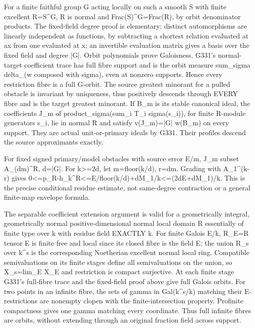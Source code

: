 For a finite faithful group G acting locally on such a smooth S with finite excellent R=S\textasciicircum{}G, R is normal and Frac(S)\textasciicircum{}G=Frac(R), by orbit denominator products. The fixed-field degree proof is elementary: distinct automorphisms are linearly independent as functions, by subtracting a shortest relation evaluated at ax from one evaluated at x; an invertible evaluation matrix gives a basis over the fixed field and degree |G|. Orbit polynomials prove Galoisness. G331's normal-target coefficient trace has full fibre support and is the orbit measure sum\_sigma delta\_(w composed with sigma), even at nonzero supports. Hence every restriction fibre is a full G-orbit. The source greatest minorant for a pulled obstacle is invariant by uniqueness, thus positively descends through EVERY fibre and is the target greatest minorant. If B\_m is its stable canonical ideal, the coefficients J\_m of product\_sigma(sum\_i T\_i sigma(s\_i)), for finite R-module generators s\_i, lie in normal R and satisfy v(J\_m)=|G| w(B\_m) on every support. They are actual unit-or-primary ideals by G331. Their profiles descend the source approximants exactly.

For fixed signed primary/model obstacles with source error E/m, J\_m subset A\_(dm)\textasciicircum{}R, d=|G|. For k>=2d, let m=floor(k/d), r=dm. Grading with A\_1\textasciicircum{}(k-r) gives 0<=p\_R-h\_k\textasciicircum{}R<=E/floor(k/d)+dM\_1/k<=(2dE+dM\_1)/k. This is the precise conditional residue estimate, not same-degree contraction or a general finite-map envelope formula.

The separable coefficient extension argument is valid for a geometrically integral, geometrically normal positive-dimensional normal local domain R essentially of finite type over k with residue field EXACTLY k. For finite Galois E/k, R\_E=R tensor E is finite free and local since its closed fibre is the field E; the union R\_s over k\textasciicircum{}s is the corresponding Noetherian excellent normal local ring. Compatible semivaluations on its finite stages define all semivaluations on the union, so X\_s=lim\_E X\_E and restriction is compact surjective. At each finite stage G331's full-fibre trace and the fixed-field proof above give full Galois orbits. For two points in an infinite fibre, the sets of gamma in Gal(k\textasciicircum{}s/k) matching their E-restrictions are nonempty clopen with the finite-intersection property. Profinite compactness gives one gamma matching every coordinate. Thus full infinite fibres are orbits, without extending through an original fraction field across support.

